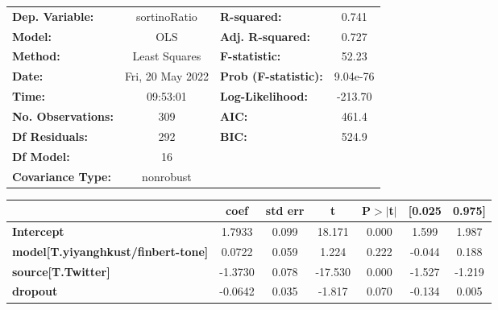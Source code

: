 \begin{center}
\begin{tabular}{lclc}
\toprule
\textbf{Dep. Variable:}                    &   sortinoRatio   & \textbf{  R-squared:         } &     0.741   \\
\textbf{Model:}                            &       OLS        & \textbf{  Adj. R-squared:    } &     0.727   \\
\textbf{Method:}                           &  Least Squares   & \textbf{  F-statistic:       } &     52.23   \\
\textbf{Date:}                             & Fri, 20 May 2022 & \textbf{  Prob (F-statistic):} &  9.04e-76   \\
\textbf{Time:}                             &     09:53:01     & \textbf{  Log-Likelihood:    } &   -213.70   \\
\textbf{No. Observations:}                 &         309      & \textbf{  AIC:               } &     461.4   \\
\textbf{Df Residuals:}                     &         292      & \textbf{  BIC:               } &     524.9   \\
\textbf{Df Model:}                         &          16      & \textbf{                     } &             \\
\textbf{Covariance Type:}                  &    nonrobust     & \textbf{                     } &             \\
\bottomrule
\end{tabular}
\begin{tabular}{lcccccc}
                                           & \textbf{coef} & \textbf{std err} & \textbf{t} & \textbf{P$> |$t$|$} & \textbf{[0.025} & \textbf{0.975]}  \\
\midrule
\textbf{Intercept}                         &       1.7933  &        0.099     &    18.171  &         0.000        &        1.599    &        1.987     \\
\textbf{model[T.yiyanghkust/finbert-tone]} &       0.0722  &        0.059     &     1.224  &         0.222        &       -0.044    &        0.188     \\
\textbf{source[T.Twitter]}                 &      -1.3730  &        0.078     &   -17.530  &         0.000        &       -1.527    &       -1.219     \\
\textbf{dropout}                           &      -0.0642  &        0.035     &    -1.817  &         0.070        &       -0.134    &        0.005     \\

\end{tabular}
\end{center}
